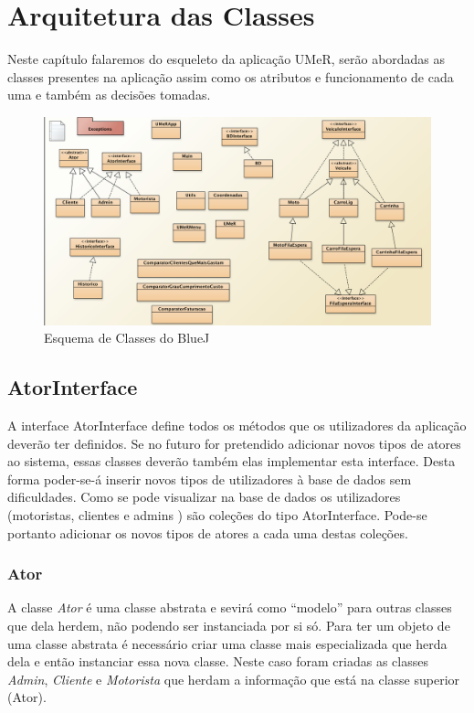 \chapter{Arquitetura das Classes}
Neste capítulo falaremos do esqueleto da  aplicação UMeR, serão abordadas as classes presentes na aplicação assim como os atributos e funcionamento de cada uma e também as decisões tomadas.
\begin{figure}[htb]
	\centering
	\includegraphics[scale=0.45]{imagem/esquemaClasses}
	\caption{Esquema de Classes do BlueJ }
	\label{p2:fig:p2_classes}
\end{figure}

\newpage

\section{AtorInterface}
A interface AtorInterface define todos os métodos que os utilizadores da aplicação deverão ter definidos. 
Se no futuro for pretendido adicionar novos tipos de atores ao sistema, essas classes deverão também elas implementar esta interface.  Desta forma poder-se-á inserir novos tipos de utilizadores à base de dados sem dificuldades. Como se pode visualizar na base de dados os utilizadores (motoristas, clientes e admins ) são coleções do tipo AtorInterface. Pode-se portanto adicionar os novos tipos de atores a cada uma destas coleções. 
 

\subsection{ Ator}
A classe  \textit{Ator} é uma classe abstrata e sevirá  como “modelo” para outras classes que dela herdem, não podendo ser instanciada por si só. Para ter um objeto de uma classe abstrata é necessário criar uma classe mais especializada que herda dela e então instanciar essa nova classe. Neste caso foram criadas as classes \textit{Admin}, \textit{Cliente} e  \textit{Motorista} que herdam a informação que está na classe superior (Ator).

